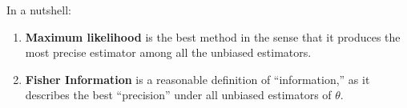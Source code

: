\documentclass[a4paper]{article}
\begin{document}
\dinkus

\noindent
In a nutshell:

\begin{tcolorbox}[mycolorbox={myblue}]
	\begin{enumerate}
		\item
			\textbf{Maximum likelihood} is the best method
			in the sense that it produces the most precise estimator among all the unbiased estimators.
		\item
			\textbf{Fisher Information} is a reasonable definition of ``information,''
			as it describes the best ``precision'' under all unbiased estimators of $\theta$.
	\end{enumerate}
\end{tcolorbox}
\end{document}
